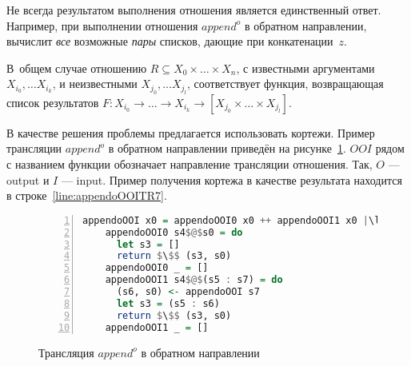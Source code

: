 Не всегда результатом выполнения отношения является единственный ответ.
Например, при выполнении отношения $append^o$ в обратном направлении, \miniKanren{} вычислит \emph{все} возможные \emph{пары} списков, дающие при конкатенации~$z$.

В~общем случае отношению $R \subseteq X_0 \times \dots \times X_n$, с известными аргументами $X_{i_0}, \dots X_{i_k}$, и неизвестными $X_{j_0}, \dots X_{j_l}$, соответствует функция, возвращающая список результатов $F : X_{i_0} \to \dots \to X_{i_k} \to [X_{j_0} \times \dots \times X_{j_l}]$. 

В качестве решения проблемы предлагается использовать кортежи.
Пример трансляции $append^o$ в обратном направлении приведён на рисунке~\ref{lst:appendoOOITR}.
$OOI$ рядом с названием функции обозначает направление трансляции отношения.
Так, $O$ --- output и $I$ --- input.
Пример получения кортежа в качестве результата находится в строке~\ref{line:appendoOOITR7}.

\begin{figure}[h!]
  \begin{center}
  \begin{minipage}{0.7\textwidth}
  \begin{lstlisting}[language=Haskell, frame=single, numbers=left,numberstyle=\small, firstnumber=1, escapechar=|]
    appendoOOI x0 = appendoOOI0 x0 ++ appendoOOI1 x0 |\label{line:appendoOOITR1}|
    appendoOOI0 s4$@$s0 = do                         |\label{line:appendoOOITR2}|
      let s3 = []                                    |\label{line:appendoOOITR3}|
      return $\$$ (s3, s0)                           |\label{line:appendoOOITR4}|
    appendoOOI0 _ = []                               |\label{line:appendoOOITR5}|
    appendoOOI1 s4$@$(s5 : s7) = do                  |\label{line:appendoOOITR6}|
      (s6, s0) <- appendoOOI s7                      |\label{line:appendoOOITR7}|
      let s3 = (s5 : s6)                             |\label{line:appendoOOITR8}|
      return $\$$ (s3, s0)                           |\label{line:appendoOOITR9}|
    appendoOOI1 _ = []                               |\label{line:appendoOOITR10}|
    \end{lstlisting}
  \end{minipage}
  \end{center}
  \caption{Трансляция $append^o$ в обратном направлении}
  \label{lst:appendoOOITR}
\end{figure}


